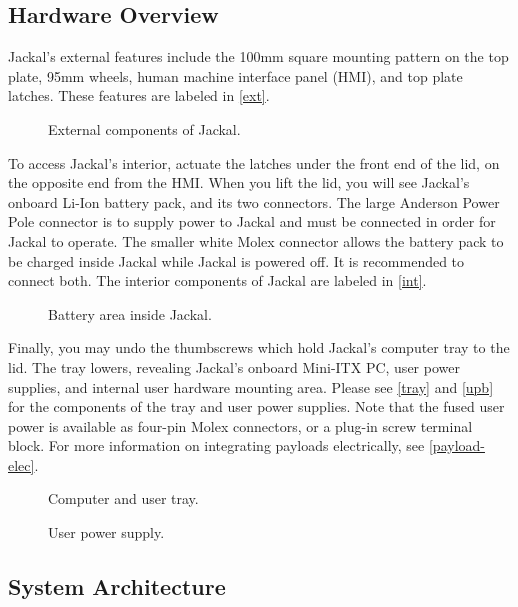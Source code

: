 \documentclass[]{clearpath-manual}
\begin{document}
\subsection{Hardware Overview}

Jackal's external features include the 100mm square mounting pattern on the top plate, 95mm wheels, human
machine interface panel (HMI), and top plate latches. These features are labeled in \autoref{ext}.

\begin{figure}[ht]
  \centering
  \placeholder{9cm}{5cm}
  \caption{External components of Jackal.}
  \label{ext}
\end{figure}

To access Jackal's interior, actuate the latches under the front end of the lid, on the opposite end from
the HMI. When you lift the lid, you will see Jackal's onboard Li-Ion battery pack, and its two connectors.
The large Anderson Power Pole connector is to supply power to Jackal and must be connected in order for
Jackal to operate. The smaller white Molex connector allows the battery pack to be charged inside Jackal 
while Jackal is powered off. It is recommended to connect both. The interior components of Jackal are
labeled in \autoref{int}.

\begin{figure}[ht]
  \centering
  \placeholder{9cm}{5cm}
  \caption{Battery area inside Jackal.}
  \label{int}
\end{figure}

Finally, you may undo the thumbscrews which hold Jackal's computer tray to the lid. The tray lowers,
revealing Jackal's onboard Mini-ITX PC, user power supplies, and internal user hardware mounting area.
Please see \autoref{tray} and \autoref{upb} for the components of the tray and user power supplies.
Note that the fused user power is available as four-pin Molex connectors, or a plug-in screw terminal
block. For more information on integrating payloads electrically, see \autoref{payload-elec}.

\begin{figure}[pt]
  \centering
  \placeholder{12cm}{8cm}
  \caption{Computer and user tray.}
  \label{tray}
\end{figure}

\begin{figure}[pb]
  \centering
  \placeholder{12cm}{8cm}
  \caption{User power supply.}
  \label{upb}
\end{figure}

\subsection{System Architecture}
\end{document}
